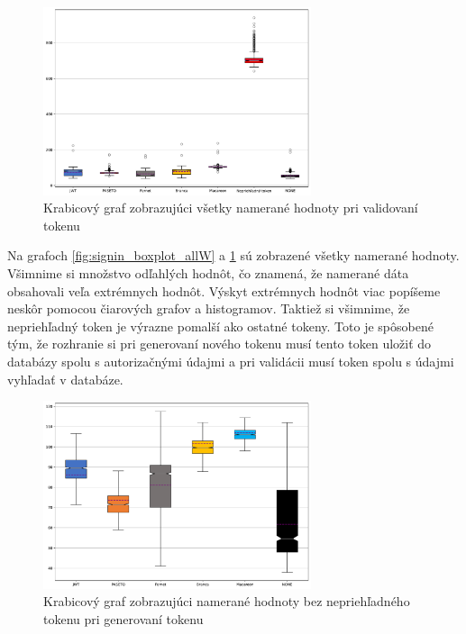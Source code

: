 \begin{figure}[H]
  \centerline{\includegraphics[width=0.7\textwidth]{images/request_boxplot_allW}}
  \caption[Krabicový graf -- validácia, všetky hodnoty]{Krabicový graf zobrazujúci všetky namerané hodnoty pri validovaní tokenu}
  \label{fig:request_boxplot_allW}
\end{figure}

Na grafoch \ref{fig:signin_boxplot_allW} a \ref{fig:request_boxplot_allW} sú zobrazené všetky namerané hodnoty. Všimnime si množstvo odľahlých hodnôt, čo znamená, že namerané dáta obsahovali veľa extrémnych hodnôt. Výskyt extrémnych hodnôt viac popíšeme neskôr pomocou čiarových grafov a histogramov. Taktiež si všimnime, že nepriehľadný token je výrazne pomalší ako ostatné tokeny. Toto je spôsobené tým, že rozhranie si pri generovaní nového tokenu musí tento token uložiť do databázy spolu s autorizačnými údajmi a pri validácii musí token spolu s údajmi vyhľadať v databáze. 

\begin{figure}[H]
  \centerline{\includegraphics[width=0.7\textwidth]{images/signin_boxplot_without_opaque}}
  \caption[Krabicový graf -- generovanie, hodnoty bez nepriehľadného tokenu]{Krabicový graf zobrazujúci namerané hodnoty bez nepriehľadného tokenu pri generovaní tokenu}
  \label{fig:signin_boxplot_without_opaque}
\end{figure}

